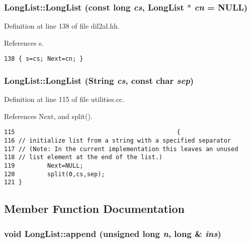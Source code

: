 \subsubsection{\setlength{\rightskip}{0pt plus 5cm}Long\-List::Long\-List (const long {\em cs}, Long\-List $\ast$ {\em cn} = NULL)\hspace{0.3cm}{\tt  [inline]}}\label{classLongList_a3}




Definition at line 138 of file dil2al.hh.

References s.



\footnotesize\begin{verbatim}138 { s=cs; Next=cn; }
\end{verbatim}\normalsize 
{}
\subsubsection{\setlength{\rightskip}{0pt plus 5cm}Long\-List::Long\-List ({\bf String} {\em cs}, const char {\em sep})}\label{classLongList_a4}




Definition at line 115 of file utilities.cc.

References Next, and split().



\footnotesize\begin{verbatim}115                                             {
116 // initialize list from a string with a specified separator
117 // (Note: In the current implementation this leaves an unused
118 // list element at the end of the list.)
119         Next=NULL;
120         split(0,cs,sep);
121 }
\end{verbatim}\normalsize 


\subsection{Member Function Documentation}
\subsubsection{\setlength{\rightskip}{0pt plus 5cm}void Long\-List::append (unsigned long {\em n}, long \& {\em ins})}\label{classLongList_a7}




